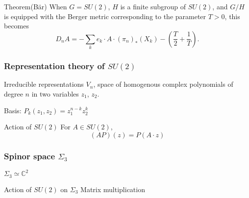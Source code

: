 \documentclass{beamer}
\def\C{{\mathbb C}}
\begin{document}
\begin{frame}
  \begin{block}{Theorem(B\"ar)}
  When $G = SU(2)$, $H$ is a finite subgroup of $SU(2)$, and $G/H$ is equipped with the Berger metric corresponding to the parameter $T>0$, this becomes
  \[
D_n A = - \sum _k e_k \cdot A \cdot (\pi_n)_*(X_k) - \left( \frac{T}{2} + \frac{1}{T} \right).
\]
  \end{block}
\end{frame}

\begin{frame}
	\frametitle{Representation theory of $SU(2)$}
  \begin{block}{Irreducible representations}
	$V_n$, space of homogenous complex polynomials of degree $n$ in two variables $z_1$, $z_2$.
	
	Basis: $P_k(z_1,z_2) = z_1^{n-k}z_2^k$
  \end{block}
  
  \begin{block}{Action of $SU(2)$}
  	For $A \in SU(2)$,
	\[
	(AP)(z) = P(A\cdot z) 
	\]
  \end{block}
\end{frame}

\begin{frame}
	\frametitle{Spinor space $\Sigma_3$}
	\begin{block}{$\Sigma_3 \simeq \C ^2$}
	\end{block}
	\begin{block}{Action of $SU(2)$ on $\Sigma_3$}
		Matrix multiplication
	\end{block}
\end{frame}
\end{document}
